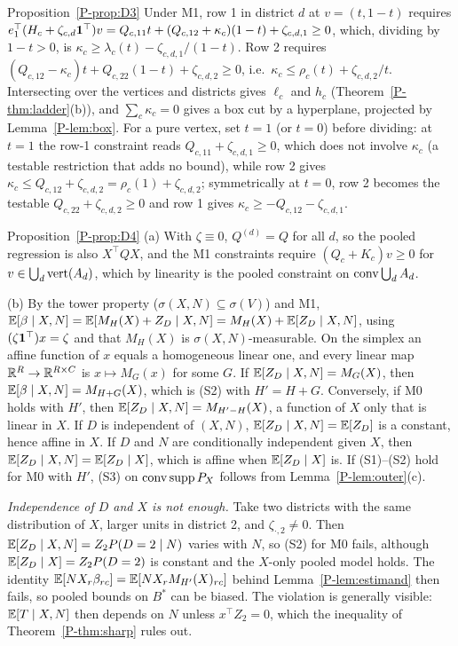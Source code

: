\begin{proofof}{Proposition~\ref{P-prop:D3}}
Under M1, row 1 in district $d$ at $v=(t,1-t)$ requires
$e_1^\top(H_c+\zeta_{c,d}\mathbf 1^\top)v=Q_{c,11}t+(Q_{c,12}+\kappa_c)(1-t)+\zeta_{c,d,1}\ge0$,
which, dividing by $1-t>0$, is $\kappa_c\ge\lambda_c(t)-\zeta_{c,d,1}/(1-t)$. Row 2
requires $(Q_{c,12}-\kappa_c)t+Q_{c,22}(1-t)+\zeta_{c,d,2}\ge0$, i.e.\
$\kappa_c\le\rho_c(t)+\zeta_{c,d,2}/t$. Intersecting over the vertices and districts
gives $\ell_c$ and $h_c$ (Theorem~\ref{P-thm:ladder}(b)), and $\sum_c\kappa_c=0$ gives a
box cut by a hyperplane, projected by Lemma~\ref{P-lem:box}. For a pure vertex, set
$t=1$ (or $t=0$) before dividing: at $t=1$ the row-1 constraint reads
$Q_{c,11}+\zeta_{c,d,1}\ge0$, which does not involve $\kappa_c$ (a testable restriction
that adds no bound), while row 2 gives $\kappa_c\le Q_{c,12}+\zeta_{c,d,2}=\rho_c(1)+\zeta_{c,d,2}$;
symmetrically at $t=0$, row 2 becomes the testable $Q_{c,22}+\zeta_{c,d,2}\ge0$ and row 1
gives $\kappa_c\ge-Q_{c,12}-\zeta_{c,d,1}$.
\end{proofof}

\begin{proofof}{Proposition~\ref{P-prop:D4}}
(a) With $\zeta\equiv0$, $Q^{(d)}=Q$ for all $d$, so the pooled regression is also
$X^\top QX$, and the M1 constraints require $(Q_c+K_c)v\ge0$ for
$v\in\bigcup_d\operatorname{vert}(A_d)$, which by linearity is the pooled constraint on
$\operatorname{conv}\bigcup_dA_d$.

(b) By the tower property ($\sigma(X,N)\subseteq\sigma(V)$) and M1,
$\mathbb E[\beta\mid X,N]=\mathbb E[M_H(X)+Z_D\mid X,N]=M_H(X)+\mathbb E[Z_D\mid X,N]$, using
$(\zeta\mathbf 1^\top)x=\zeta$ and that $M_H(X)$ is $\sigma(X,N)$-measurable. On the simplex an
affine function of $x$ equals a homogeneous linear one, and every linear map
$\mathbb R^R\to\mathbb R^{R\times C}$ is $x\mapsto M_G(x)$ for some $G$. If $\mathbb E[Z_D\mid X,N]=M_G(X)$,
then $\mathbb E[\beta\mid X,N]=M_{H+G}(X)$, which is (S2) with $H'=H+G$. Conversely, if M0
holds with $H'$, then $\mathbb E[Z_D\mid X,N]=M_{H'-H}(X)$, a function of $X$ only that is
linear in $X$. If $D$ is independent of $(X,N)$, $\mathbb E[Z_D\mid X,N]=\mathbb E[Z_D]$ is a
constant, hence affine in $X$. If $D$ and $N$ are conditionally independent given $X$,
then $\mathbb E[Z_D\mid X,N]=\mathbb E[Z_D\mid X]$, which is affine when $\mathbb E[Z_D\mid X]$ is. If
(S1)--(S2) hold for M0 with $H'$, (S3) on $\operatorname{conv}\operatorname{supp} P_X$ follows from
Lemma~\ref{P-lem:outer}(c).

\emph{Independence of $D$ and $X$ is not enough.} Take two districts with the same
distribution of $X$, larger units in district 2, and $\zeta_{\cdot,2}\ne0$. Then
$\mathbb E[Z_D\mid X,N]=Z_2P(D=2\mid N)$ varies with $N$, so (S2) for M0 fails, although
$\mathbb E[Z_D\mid X]=Z_2P(D=2)$ is constant and the $X$-only pooled model holds. The identity
$\mathbb E[NX_r\beta_{rc}]=\mathbb E[NX_rM_{H'}(X)_{rc}]$ behind Lemma~\ref{P-lem:estimand} then fails,
so pooled bounds on $B^*$ can be biased. The violation is generally visible: $\mathbb E[T\mid
X,N]$ then depends on $N$ unless $x^\top Z_2=0$, which the inequality of
Theorem~\ref{P-thm:sharp} rules out.
\end{proofof}

